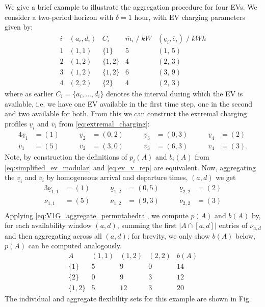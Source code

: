 \begin{exmp}
    We give a brief example to illustrate the aggregation procedure for four EVs. We consider a two-period horizon with $\delta=1$ hour, with EV charging parameters given by:
        \[
    \begin{array}{c|c|c|c|c}
    i & (a_i,d_i) & C_i & \overline m_i \;/\;kW  & (\underline e_i,\overline e_i) \;/\; kWh  \\ \hline
    1 & (1,1) & \{1\}   & 5 & (1,\,5) \\
    2 & (1,2) & \{1,2\} & 4 & (2,\,3)   \\
    3 & (1,2) & \{1,2\} & 6 & (3,\,9) \\
    4 & (2,2) & \{2\} & 4 & (2,\,3)
    \end{array}
    \]
    where as earlier $C_i=\{a_i,\dots,d_i\}$ denotes the interval during which the EV is available, i.e. we have one EV available in the first time step, one in the second and two available for both. From this we can construct the extremal charging profiles $\underline{v}_i$ and $\overline{v}_i$ from \eqref{eq:extremal_charging}:
    \begin{alignat*}{4}
    \underline v_1 &=(1)   &\qquad \underline v_2 &=(0,2) &\qquad \underline v_3 &=(0,3) &\qquad \underline v_4 &=(2)\\
    \overline  v_1 &=(5)   &\qquad \overline  v_2 &=(3,0) &\qquad \overline  v_3 &=(6,3) &\qquad \overline v_4 &=(3).
    \end{alignat*}
    Note, by construction the definitions of $p_i(A)$ and $b_i(A)$ from \eqref{eq:simplified_ev_modular} and \eqref{eq:ev_v_rep} are equivalent. Now, aggregating the $\underline v_i$ and $\overline v_i$ by homogeneous arrival and departure times, $(a, d)$ we get
    \begin{alignat*}{3}
    \underline \nu_{1,1} &=(1)   &\qquad \underline \nu_{1,2} &=(0,5) &\qquad \underline \nu_{2,2} &=(2)\\
    \overline \nu_{1,1} &=(5)   &\qquad \overline \nu_{1,2} &=(9,3) &\qquad \overline \nu_{2,2} &=(3)\\
    \end{alignat*}
    Applying \eqref{eq:V1G_aggregate_permutahedra}, we compute \(p(A)\) and \(b(A)\) by, for each availability window \((a,d)\), summing the first \(|A\cap[a,d]|\) entries of \(\overline{\nu}_{a,d}\) and then aggregating across all \((a,d)\); for brevity, we only show \(b(A)\) below, $p(A)$ can be computed analogously.
    \[ 
    \begin{array}{c|ccc|c}
    A & (1,1) & (1,2) & (2,2) & b(A) \\ \hline
    \{1\}   & 5 & 9  & 0 & 14 \\
    \{2\}   & 0 & 9  & 3 & 12 \\
    \{1,2\} & 5 & 12 & 3 & 20
    \end{array}
    \]
    The individual and aggregate flexibility sets for this example are shown in Fig.
    \end{exmp}
    